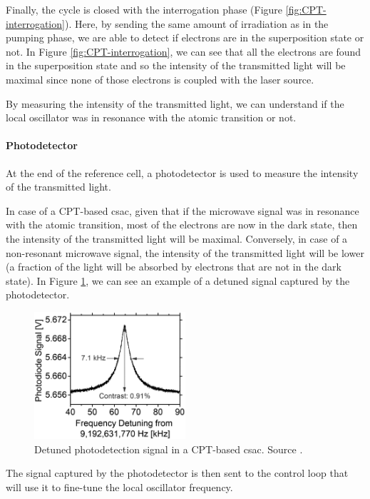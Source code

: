 Finally, the cycle is closed with the interrogation phase (Figure \ref{fig:CPT-interrogation}).
Here, by sending the same amount of irradiation as in the pumping phase, we are able to detect if electrons are in the superposition state or not.
In Figure \ref{fig:CPT-interrogation}, we can see that all the electrons are found in the superposition state and so the intensity of the transmitted light will be maximal since none of those electrons is coupled with the laser source.

By measuring the intensity of the transmitted light, we can understand if the local oscillator was in resonance with the atomic transition or not.


\paragraph{Photodetector}

At the end of the reference cell, a photodetector is used to measure the intensity of the transmitted light.

In case of a CPT-based \acrshort{csac}, given that if the microwave signal was in resonance with the atomic transition, most of the electrons are now in the dark state, then the intensity of the transmitted light will be maximal.
Conversely, in case of a non-resonant microwave signal, the intensity of the transmitted light will be lower (a fraction of the light will be absorbed by electrons that are not in the dark state).
In Figure \ref{fig:CPT-transmission}, we can see an example of a detuned signal captured by the photodetector.

\begin{figure}[H]
    \centering
    \includegraphics[width=0.5\textwidth, max width=0.8\linewidth]{img/CPT-transmission-signal.png}
    \caption{Detuned photodetection signal in a CPT-based \acrshort{csac}. Source \cite{Kitching-2018}.}
    \label{fig:CPT-transmission}
\end{figure}

The signal captured by the photodetector is then sent to the control loop that will use it to fine-tune the local oscillator frequency.

